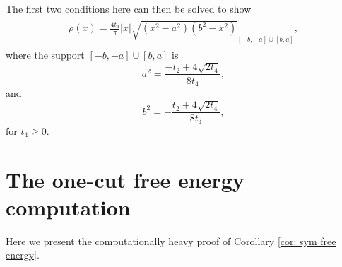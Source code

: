 \documentclass[10pt]{article}
\theoremstyle{plain}
\theoremstyle{definition}
\theoremstyle{plain}
\begin{document}
The first two conditions here can then be solved to show
\begin{align*}
\begin{split}
\rho(x) = \frac{4t_{4}}{\pi}|x| \sqrt{(x^{2}-a^{2})(b^{2}-x^{2})}_{[-b,-a]\cup [b,a]},
\end{split}
\end{align*}
where the support $[-b,-a]\cup [b,a]$ is
\begin{equation*}
a^{2}= \frac{-t_{2}+ 4 \sqrt{2t_{4}}}{8t_{4}},
\end{equation*}
and 
\begin{equation*}
b^{2}= -\frac{t_{2}+ 4 \sqrt{2t_{4}}}{8t_{4}},
\end{equation*}
for $t_{4}\geq 0$.
\section{The one-cut free energy computation}\label{appC}
Here we present the computationally heavy proof of Corollary \ref{cor: sym free energy}.
\end{document}
